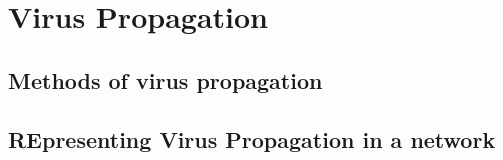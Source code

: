 \chapter{Virus Propagation }
\label{chapter4: Virus propagation}
%
%
%
%
%
%
%
\section{Methods of virus propagation}
\section{REpresenting Virus Propagation in a network}



